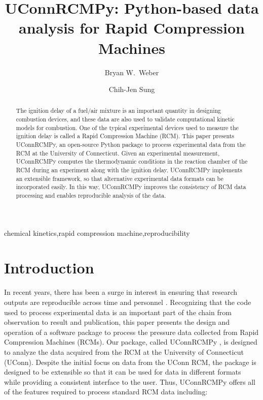 \documentclass[12pt]{../ussci}
\title{ UConnRCMPy: Python-based data analysis for Rapid Compression Machines }
\author[1*]{Bryan W.\ Weber}
\author[1]{Chih-Jen Sung}
\affil[1]{Department of Mechanical Engineering, University of Connecticut, Storrs,
CT, USA}
\affil[*]{Corresponding Author: \email{bryan.weber@uconn.edu}}
\begin{document}
\maketitle

\begin{abstract} %
    The ignition delay of a fuel/air mixture is an important quantity in
    designing combustion devices, and these data are also used to validate
    computational kinetic models for combustion. One of the typical experimental
    devices used to measure the ignition delay is called a Rapid Compression
    Machine (RCM). This paper presents UConnRCMPy, an open-source Python package
    to process experimental data from the RCM at the University of Connecticut.
    Given an experimental measurement, UConnRCMPy computes the thermodynamic
    conditions in the reaction chamber of the RCM during an experiment along
    with the ignition delay. UConnRCMPy implements an extensible framework, so
    that alternative experimental data formats can be incorporated easily. In
    this way, UConnRCMPy improves the consistency of RCM data processing and
    enables reproducible analysis of the data.
\end{abstract}

\begin{keyword}
    chemical kinetics\sep rapid compression machine\sep reproducibility
\end{keyword}

\section{Introduction}\label{introduction}

In recent years, there has been a surge in interest in ensuring that research
outputs are reproducible across time and personnel \autocite{NatureEds2016}.
Recognizing that the code used to process experimental data is an important part
of the chain from observation to result and publication, this paper presents the
design and operation of a software package to process the pressure data
collected from Rapid Compression Machines (RCMs). Our package, called UConnRCMPy
\autocite{uconnrcmpy}, is designed to analyze the data acquired from the RCM at
the University of Connecticut (UConn). Despite the initial focus on data from
the UConn RCM, the package is designed to be extensible so that it can be used
for data in different formats while providing a consistent interface to the
user. Thus, UConnRCMPy offers all of the features required to process standard
RCM data including:
\end{document}
